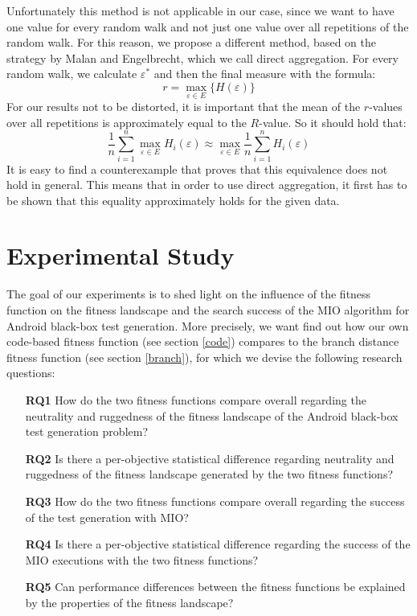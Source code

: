 \documentclass[
  a4paper,  %
  twoside,  %
  bibliography=totoc,
  headsepline,
  cleardoublepage=empty,
  parskip=half,
  draft=false
]{scrbook}
\begin{document}
Unfortunately this method is not applicable in our case, since we want to have one value for every random walk and not just one value over all repetitions of the random walk.
For this reason, we propose a different method, based on the strategy by Malan and Engelbrecht, which we call direct aggregation.
For every random walk, we calculate $\varepsilon^{*}$ and then the final measure with the formula:
\begin{equation}
	r = \max_{\varepsilon \in E} \{H(\varepsilon)\}
\end{equation}
For our results not to be distorted, it is important that the mean of the $r$-values over all repetitions is approximately equal to the $R$-value. So it should hold that:
\begin{equation}\label{eq:directaggr}
	\frac{1}{n} \sum_{i = 1}^{n} \max_{\varepsilon \in E} H_i(\varepsilon) \approx \max_{\varepsilon \in E} \frac{1}{n}\sum_{i = 1}^{n} H_i(\varepsilon)
\end{equation}
It is easy to find a counterexample that proves that this equivalence does not hold in general.
This means that in order to use direct aggregation, it first has to be shown that this equality approximately holds for the given data.



\chapter{Experimental Study}

The goal of our experiments is to shed light on the influence of the fitness function on the fitness landscape and the search success of the MIO algorithm for Android black-box test generation. More precisely, we want find out how our own code-based fitness function (see section \ref{code}) compares to the branch distance fitness function (see section \ref{branch}), for which we devise the following research questions:

\begin{enumerate}
	\item[\textbf{RQ1}] How do the two fitness functions compare overall regarding the neutrality and ruggedness of the fitness landscape of the Android black-box test generation problem?
	
	\item[\textbf{RQ2}] Is there a per-objective statistical difference regarding neutrality and ruggedness of the fitness landscape generated by the two fitness functions?
	
	\item[\textbf{RQ3}] How do the two fitness functions compare overall regarding the success of the test generation with MIO?
	
	\item[\textbf{RQ4}] Is there a per-objective statistical difference regarding the success of the MIO executions with the two fitness functions?
	
	\item[\textbf{RQ5}] Can performance differences between the fitness functions be explained by the properties of the fitness landscape?
\end{enumerate}
\end{document}

